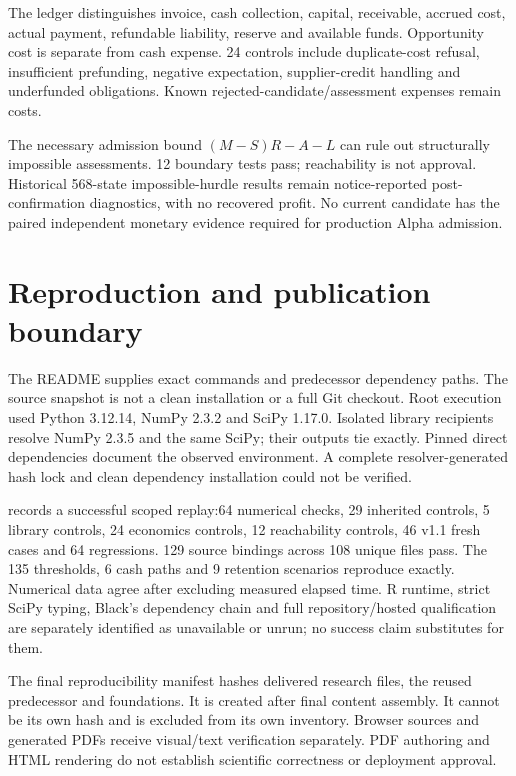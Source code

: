 \documentclass[10 pt]{article}
\begin{document}
The ledger distinguishes invoice, cash collection, capital, receivable, accrued cost, actual payment, refundable liability, reserve and available funds. Opportunity cost is separate from cash expense. 24 controls include duplicate-cost refusal, insufficient prefunding, negative expectation, supplier-credit handling and underfunded obligations. Known rejected-candidate/assessment expenses remain costs.

The necessary admission bound $(M-S)R-A-L$ can rule out structurally impossible assessments. 12 boundary tests pass; reachability is not approval. Historical 568-state impossible-hurdle results remain notice-reported post-confirmation diagnostics, with no recovered profit. No current candidate has the paired independent monetary evidence required for production Alpha admission.

\section{Reproduction and publication boundary}

The README supplies exact commands and predecessor dependency paths. The source snapshot is not a clean installation or a full Git checkout. Root execution used Python 3.12.14, NumPy 2.3.2 and SciPy 1.17.0. Isolated library recipients resolve NumPy 2.3.5 and the same SciPy; their outputs tie exactly. Pinned direct dependencies document the observed environment. A complete resolver-generated hash lock and clean dependency installation could not be verified.

 records a successful scoped replay:64 numerical checks, 29 inherited controls, 5 library controls, 24 economics controls, 12 reachability controls, 46 v1.1 fresh cases and 64 regressions. 129 source bindings across 108 unique files pass. The 135 thresholds, 6 cash paths and 9 retention scenarios reproduce exactly. Numerical data agree after excluding measured elapsed time. R runtime, strict SciPy typing, Black's dependency chain and full repository/hosted qualification are separately identified as unavailable or unrun; no success claim substitutes for them.

The final reproducibility manifest hashes delivered research files, the reused predecessor and foundations. It is created after final content assembly. It cannot be its own hash and is excluded from its own inventory. Browser sources and generated PDFs receive visual/text verification separately. PDF authoring and HTML rendering do not establish scientific correctness or deployment approval.
\end{document}

